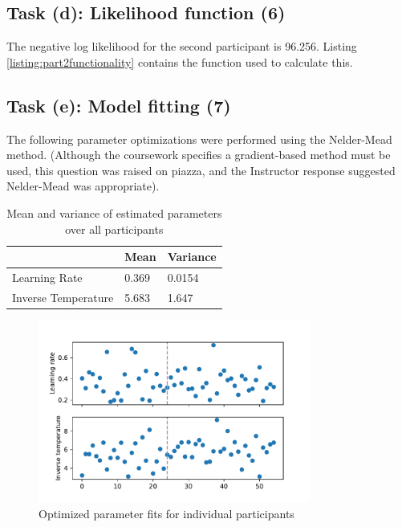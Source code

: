 \documentclass{article}
\begin{document}
\subsection{Task (d): Likelihood function (6)}

The negative log likelihood for the second participant is 96.256. Listing \ref{listing:part2functionality} contains the function used to calculate this.

\subsection{Task (e): Model fitting (7)}

The following parameter optimizations were performed using the Nelder-Mead method. (Although the coursework specifies a gradient-based method must be used, this question was raised on piazza, and the Instructor response suggested Nelder-Mead was appropriate).

\begin{table}[H]
  \centering
  \begin{tabular}{@{}lll@{}}
  \toprule
                      & Mean    & Variance     \\ \midrule
  Learning Rate       & 0.369 &  0.0154  \\
  Inverse Temperature & 5.683 &  1.647    \\ \bottomrule
  \end{tabular}
  \caption{Mean and variance of estimated parameters over all participants}
  \label{table:parameterstatistics}
\end{table}

\begin{figure}[H]
  \centering
  \includegraphics[width=0.8\textwidth]{figures/part2/task5/individual_optimized_parameters.pdf}
  \caption{Optimized parameter fits for individual participants}
  \label{fig:individualoptimizedparameters}
\end{figure}
\end{document}
